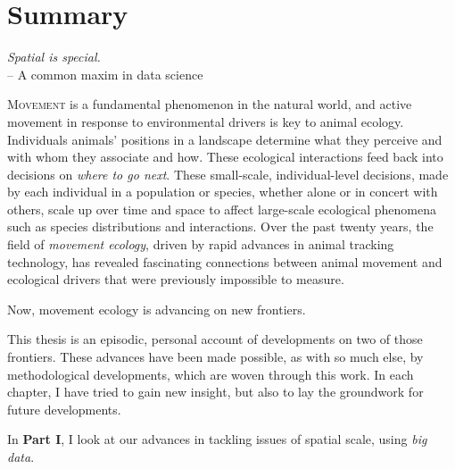 \begingroup

\chapter*{Summary}

\begin{center}
    \emph{Spatial is special.}\\
    \medskip
    -- \small{A common maxim in data science}
\end{center}

\lettrine{M}{ovement} is a fundamental phenomenon in the natural world, and active movement in response to environmental drivers is key to animal ecology.
Individuals animals' positions in a landscape determine what they perceive and with whom they associate and how.
These ecological interactions feed back into decisions on \textit{where to go next}.
These small-scale, individual-level decisions, made by each individual in a population or species, whether alone or in concert with others, scale up over time and space to affect large-scale ecological phenomena such as species distributions and interactions.
Over the past twenty years, the field of \textit{movement ecology}, driven by rapid advances in animal tracking technology, has revealed fascinating connections between animal movement and ecological drivers that were previously impossible to measure.

\medskip

\noindent Now, movement ecology is advancing on new frontiers.

\medskip

\noindent This thesis is an episodic, personal account of developments on two of those frontiers. These advances have been made possible, as with so much else, by methodological developments, which are woven through this work. In each chapter, I have tried to gain new insight, but also to lay the groundwork for future developments.

\medskip

\noindent In \textbf{Part I}, I look at our advances in tackling issues of spatial scale, using \textit{big data}.

\medskip

